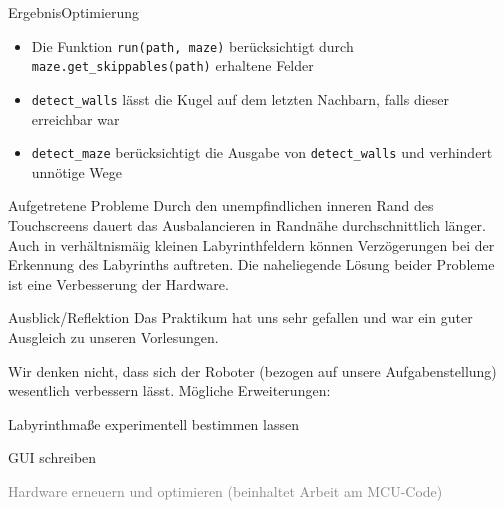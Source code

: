 \documentclass{beamer}
\begin{document}
\begin{frame}[fragile,t]{Ergebnis}{Optimierung}
\begin{itemize}
\item Die Funktion \verb~run(path, maze)~ berücksichtigt durch \verb~maze.get_skippables(path)~ erhaltene Felder
\item \verb~detect_walls~ lässt die Kugel auf dem letzten Nachbarn, falls dieser erreichbar war
\item \verb~detect_maze~ berücksichtigt die Ausgabe von \verb~detect_walls~ und verhindert unnötige Wege
\end{itemize}
\end{frame}

\begin{frame}[fragile,t]{Aufgetretene Probleme}
Durch den unempfindlichen inneren Rand des Touchscreens dauert das Ausbalancieren in Randnähe durchschnittlich länger. Auch in verhältnismäig kleinen Labyrinthfeldern können Verzögerungen bei der Erkennung des Labyrinths auftreten. Die naheliegende Lösung beider Probleme ist eine Verbesserung der Hardware.
\end{frame}

\begin{frame}[fragile,t]{Ausblick/Reflektion}
Das Praktikum hat uns sehr gefallen und war ein guter Ausgleich zu unseren Vorlesungen.

\medskip\noindent
Wir denken nicht, dass sich der Roboter (bezogen auf unsere Aufgabenstellung) wesentlich verbessern lässt. Mögliche Erweiterungen:
\begin{itemize}
\item Labyrinthmaße experimentell bestimmen lassen
\item GUI schreiben
\textcolor{gray}{
\item[\textcolor{gray}{$\triangleright$}] Hardware erneuern und optimieren (beinhaltet Arbeit am MCU-Code)
}
\end{itemize}
\end{frame}


\end{document}
